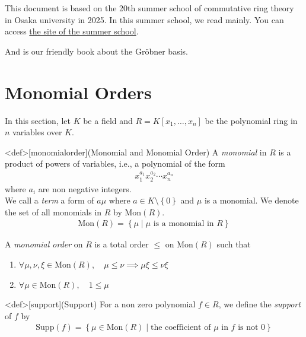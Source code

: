 \documentclass{article}
\renewcommand{\mid}{\middle|}
\begin{document}
This document is based on the 20th summer school of commutative ring theory in Osaka university in 2025. In this summer school, we read \cite{Bruns2022} mainly. You can access \href{https://sites.google.com/view/comm-ring-summer-school-2025/%E3%83%9B%E3%83%BC%E3%83%A0?authuser=0}{the site of the summer school}. 

And \cite{Herzog2011} is our friendly book about the Gr\"{o}bner basis. 

\newpage

\section{Monomial Orders}
In this section, let $K$ be a field and $R = K[x_1, \ldots, x_n]$ be the polynomial ring in $n$ variables over $K$.

\begin{statementsp}<def>[monomialorder](Monomial and Monomial Order)
    A \textit{monomial} in $R$ is a product of powers of variables, i.e., a polynomial of the form
    \begin{align}
        x_1^{a_1} x_2^{a_2} \cdots x_n^{a_n}
    \end{align}
    where $a_i$ are non negative integers. \\ 
    We call a \textit{term} a form of $a \mu$ where $a \in K \setminus \left\{ 0 \right\}$ and $\mu$ is a monomial. We denote the set of all monomials in $R$ by $\mathrm{Mon}(R)$. 
    \begin{align}
        \mathrm{Mon}(R) = \left\{ \mu \mid \mu \text{ is a monomial in } R \right\}
    \end{align}

    A \textit{monomial order} on $R$ is a total order $\leq$ on $\mathrm{Mon}(R)$ such that 
    \begin{enumerate}
        \item $\forall \mu, \nu, \xi \in \mathrm{Mon}(R), \quad \mu \leq \nu \implies \mu \xi \leq \nu \xi$
        \item $\forall \mu \in \mathrm{Mon}(R), \quad 1 \leq \mu$
    \end{enumerate}
\end{statementsp}

\begin{statementsp}<def>[support](Support)
    For a non zero polynomial $f \in R$, we define the \textit{support} of $f$ by
    \begin{align}
        \mathrm{Supp}(f) = \left\{ \mu \in \mathrm{Mon}(R) \mid \text{the coefficient of } \mu \text{ in } f \text{ is not } 0 \right\}
    \end{align}
\end{statementsp}
\end{document}
